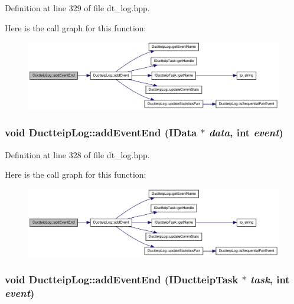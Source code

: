 Definition at line 329 of file dt\_\-log.hpp.

Here is the call graph for this function:\nopagebreak
\begin{figure}[H]
\begin{center}
\leavevmode
\includegraphics[width=369pt]{class_ductteip_log_a97b60b9f85253cdb916a0b2fed7b02ef_cgraph}
\end{center}
\end{figure}
\hypertarget{class_ductteip_log_a03ef2af6f52a01927e841df2399e995e}{
\subsubsection[{addEventEnd}]{\setlength{\rightskip}{0pt plus 5cm}void DuctteipLog::addEventEnd ({\bf IData} $\ast$ {\em data}, \/  int {\em event})}}
\label{class_ductteip_log_a03ef2af6f52a01927e841df2399e995e}


Definition at line 328 of file dt\_\-log.hpp.

Here is the call graph for this function:\nopagebreak
\begin{figure}[H]
\begin{center}
\leavevmode
\includegraphics[width=369pt]{class_ductteip_log_a03ef2af6f52a01927e841df2399e995e_cgraph}
\end{center}
\end{figure}
\hypertarget{class_ductteip_log_a9a010d4387f7f74b848d5c36aaacd501}{
\subsubsection[{addEventEnd}]{\setlength{\rightskip}{0pt plus 5cm}void DuctteipLog::addEventEnd ({\bf IDuctteipTask} $\ast$ {\em task}, \/  int {\em event})}}
\label{class_ductteip_log_a9a010d4387f7f74b848d5c36aaacd501}


